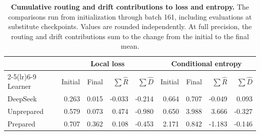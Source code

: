 \begin{table}[ht]
\centering\small
\setlength{\tabcolsep}{4pt}
\begin{tabular}{lrrrrrrrr}
\toprule
&\multicolumn{4}{c}{Local loss}&\multicolumn{4}{c}{Conditional entropy}\\
\cmidrule(lr){2-5}\cmidrule(lr){6-9}
Learner & Initial & Final & $\sum\widehat R$ & $\sum\widehat D$ & Initial & Final & $\sum\widehat R$ & $\sum\widehat D$\\
\midrule
DeepSeek & 0.263 & 0.015 & -0.033 & -0.214 & 0.664 & 0.707 & -0.049 & 0.093\\
Unprepared & 0.579 & 0.073 & 0.474 & -0.980 & 0.650 & 3.988 & 3.666 & -0.327\\
Prepared & 0.707 & 0.362 & 0.108 & -0.453 & 2.171 & 0.842 & -1.183 & -0.146\\
\bottomrule
\end{tabular}
\caption{\textbf{Cumulative routing and drift contributions to loss and entropy.} The comparisons run from initialization through batch 161, including evaluations at substitute checkpoints. Values are rounded independently. At full precision, the routing and drift contributions sum to the change from the initial to the final mean.}\label{tab:rd-summary}
\end{table}
